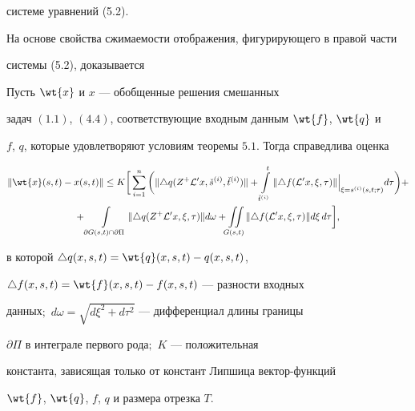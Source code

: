 системе уравнений (5.2).





На основе свойства сжимаемости отображения, фигурирующего в правой части


системы (5.2), доказывается 





\begin{thms}


Пусть $\wt{x}$ и $x$ --- обобщенные решения смешанных


задач $(1.1)$, $(4.4)$, соответствующие входным данным $\wt{f}$, $\wt{q}$ и


$f$, $q$, которые удовлетворяют условиям теоремы $5.1$. Тогда справедлива оценка


\begin{gather*}


\| \wt{x} (s,t) - x(s,t)\| \leq {K} \bigg[


\sum\limits_{i=1}^{n} \bigg(\| \triangle q (Z^{+}{\cal L}^{\prime}x, 


\check{s}^{(i)},\check{t}^{(i)}) \|+


\int\limits_{\check{t}^{(i)}}^{t} \|\triangle f ({\cal L}^{\prime}x, \xi, \tau)


\| \Big|_{\xi=s^{(i)}(s,t; \tau)} d\tau \bigg) + \\


%


+\int\limits_{\partial G(s,t) \cap \partial {\Pi}} 


\| \triangle q (Z^{+} {\cal L}^{\prime}x, \xi,\tau) \| d\omega


+\iint\limits_{G(s,t)}


\| \triangle f ({\cal L}^{\prime}x, \xi,\tau) \| d\xi\, d\tau \bigg],


\end{gather*}


в которой $\triangle q (x,s,t)=\wt{q} (x,s,t) - q(x,s,t)$,


$\triangle f (x,s,t)=\wt{f} (x,s,t) - f(x,s,t)$ --- разности входных 


данных$;$ $d\omega=\sqrt{d\xi^2+d\tau^2}$ --- дифференциал длины границы


$\partial {\Pi}$ в интеграле первого рода$;$ $K$ --- положительная 


константа, зависящая только от констант Липшица вектор-функций 


$\wt{f}$, $\wt{q}$, $f$, $q$ и размера отрезка $T$.


\end{thms}





